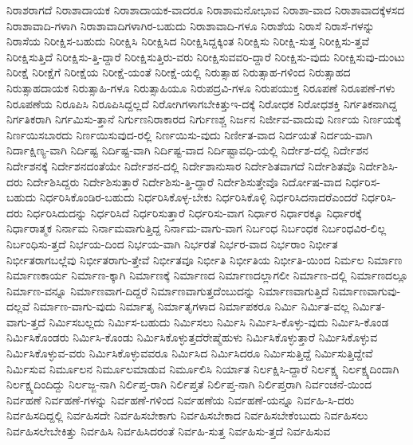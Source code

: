 {ನಿರಾಶರಾಗದೆ
ನಿರಾಶಾದಾಯಕ
ನಿರಾಶಾದಾಯಕ-ವಾದರೂ
ನಿರಾಶಾಮನೋಭಾವ
ನಿರಾಶಾ-ವಾದ
ನಿರಾಶಾವಾದಕ್ಕೆಳಸದ
ನಿರಾಶಾವಾದಿ-ಗಳಾಗಿ
ನಿರಾಶಾವಾದಿಗಳಾಗಿರ-ಬಹುದು
ನಿರಾಶಾವಾದಿ-ಗಳೂ
ನಿರಾಶೆಯ
ನಿರಾಸೆ
ನಿರಾಸೆ-ಗಳನ್ನು
ನಿರಾಸೆಯ
ನಿರೀಕ್ಷಿಸ-ಬಹುದು
ನಿರೀಕ್ಷಿಸಿ
ನಿರೀಕ್ಷಿಸಿದ
ನಿರೀಕ್ಷಿಸಿದ್ದಕ್ಕಿಂತ
ನಿರೀಕ್ಷಿಸು
ನಿರೀಕ್ಷಿ-ಸುತ್ತ
ನಿರೀಕ್ಷಿಸು-ತ್ತವೆ
ನಿರೀಕ್ಷಿಸುತ್ತಿದೆ
ನಿರೀಕ್ಷಿಸು-ತ್ತಿ-ದ್ದಾರೆ
ನಿರೀಕ್ಷಿಸುತ್ತಿರು-ವರು
ನಿರೀಕ್ಷಿಸುವವರಿ-ದ್ದಾರೆ
ನಿರೀಕ್ಷಿಸು-ವುದು
ನಿರೀಕ್ಷಿಸುವು-ದುಂಟು
ನಿರೀಕ್ಷೆ
ನಿರೀಕ್ಷೆಗೆ
ನಿರೀಕ್ಷೆಯ
ನಿರೀಕ್ಷೆ-ಯಂತೆ
ನಿರೀಕ್ಷೆ-ಯಲ್ಲಿ
ನಿರುತ್ಸಾಹ
ನಿರುತ್ಸಾಹ-ಗಳಿಂದ
ನಿರುತ್ಸಾಹದ
ನಿರುತ್ಸಾಹದಾಯಕ
ನಿರುತ್ಸಾಹಿ-ಗಳೂ
ನಿರುತ್ಸಾಹಿಯೂ
ನಿರುಪದ್ರವಿ-ಗಳೂ
ನಿರುಪಯುಕ್ತ
ನಿರೂಪಣೆ
ನಿರೂಪಣೆ-ಗಳು
ನಿರೂಪಣೆಯ
ನಿರೂಪಿಸಿ
ನಿರೂಪಿಸಿದ್ದಲ್ಲದೆ
ನಿರೋಗಿಗಳಾಗಬೇಕಿತ್ತುಇ-ದಕ್ಕೆ
ನಿರೋಧಕ
ನಿರೋಧಶಕ್ತಿ
ನಿರ್ಗತಿಕನಾಗಿದ್ದ
ನಿರ್ಗತಿಕರಾಗಿ
ನಿರ್ಗಮಿಸು-ತ್ತಾನೆ
ನಿರ್ಗುಣನಿರಾಕಾರದ
ನಿರ್ಗುಣಶ್ಚ
ನಿರ್ಜನ
ನಿರ್ಜೀವ-ವಾದುವು
ನಿರ್ಣಯ
ನಿರ್ಣಯಕ್ಕೆ
ನಿರ್ಣಯಿಸಬಾರದು
ನಿರ್ಣಯಿಸುವುದ-ರಲ್ಲಿ
ನಿರ್ಣಯಿಸು-ವುದು
ನಿರ್ಣೀತ-ವಾದ
ನಿರ್ದಯತೆ
ನಿರ್ದಯ-ವಾಗಿ
ನಿರ್ದಾಕ್ಷಿಣ್ಯ-ವಾಗಿ
ನಿರ್ದಿಷ್ಟ
ನಿರ್ದಿಷ್ಟ-ವಾಗಿ
ನಿರ್ದಿಷ್ಟ-ವಾದ
ನಿರ್ದಿಷ್ಟಾವಧಿ-ಯಲ್ಲಿ
ನಿರ್ದೇಶ-ದಲ್ಲಿ
ನಿರ್ದೇಶನ
ನಿರ್ದೇಶನಕ್ಕೆ
ನಿರ್ದೇಶನದಂತೆಯೇ
ನಿರ್ದೇಶನ-ದಲ್ಲಿ
ನಿರ್ದೇಶಾನುಸಾರ
ನಿರ್ದೇಶಿತವಾಗದೆ
ನಿರ್ದೇಶಿತವೊ
ನಿರ್ದೇಶಿಸಿ-ದರು
ನಿರ್ದೇಶಿಸಿದ್ದರು
ನಿರ್ದೇಶಿಸುತ್ತಾರೆ
ನಿರ್ದೇಶಿಸು-ತ್ತಿ-ದ್ದಾರೆ
ನಿರ್ದೇಶಿಸುತ್ತೇವೊ
ನಿರ್ದೋಷ-ವಾದ
ನಿರ್ಧರಿಸ-ಬಹುದು
ನಿರ್ಧರಿಸಿಕೊಂಡಿರ-ಬಹುದು
ನಿರ್ಧರಿಸಿಕೊಳ್ಳ-ಬೇಕು
ನಿರ್ಧರಿಸಿಕೊಳ್ಳಿ
ನಿರ್ಧರಿಸಿದನಾದರೆಎಂದರೆ
ನಿರ್ಧರಿಸಿ-ದರು
ನಿರ್ಧರಿಸಿದುದನ್ನು
ನಿರ್ಧರಿಸಿದೆ
ನಿರ್ಧರಿಸುತ್ತಾರೆ
ನಿರ್ಧರಿಸು-ವಾಗ
ನಿರ್ಧಾರ
ನಿರ್ಧಾರಕ್ಕೂ
ನಿರ್ಧಾರಕ್ಕೆ
ನಿರ್ಧಾರಾತ್ಮಕ
ನಿರ್ನಾಮ
ನಿರ್ನಾಮವಾಗುತ್ತಿದ್ದ
ನಿರ್ನಾಮ-ವಾಗು-ವಾಗ
ನಿರ್ಬಂಧ
ನಿರ್ಬಂಧಕ
ನಿರ್ಬಂಧವಿರ-ಲಿಲ್ಲ
ನಿರ್ಬಂಧಿಸು-ತ್ತದೆ
ನಿರ್ಭಯ-ದಿಂದ
ನಿರ್ಭಯ-ವಾಗಿ
ನಿರ್ಭರತೆ
ನಿರ್ಭರ-ವಾದ
ನಿರ್ಭರಾಂ
ನಿರ್ಭೀತ
ನಿರ್ಭೀತರಾಗಬಲ್ಲೆವು
ನಿರ್ಭೀತರಾಗು-ತ್ತೇವೆ
ನಿರ್ಭೀತವೂ
ನಿರ್ಭೀತಿ
ನಿರ್ಭೀತಿಯ
ನಿರ್ಭೀತಿ-ಯಿಂದ
ನಿರ್ಮಲ
ನಿರ್ಮಾಣ
ನಿರ್ಮಾಣಕಾರ್ಯ
ನಿರ್ಮಾಣ-ಕ್ಕಾಗಿ
ನಿರ್ಮಾಣಕ್ಕೆ
ನಿರ್ಮಾಣದ
ನಿರ್ಮಾಣದಲ್ಲಾಗಲೀ
ನಿರ್ಮಾಣ-ದಲ್ಲಿ
ನಿರ್ಮಾಣದಲ್ಲೂ
ನಿರ್ಮಾಣ-ವನ್ನೂ
ನಿರ್ಮಾಣವಾಗ-ದಿದ್ದರೆ
ನಿರ್ಮಾಣವಾಗುತ್ತದೆಂಬುದನ್ನು
ನಿರ್ಮಾಣವಾಗುತ್ತಿದೆ
ನಿರ್ಮಾಣವಾಗುವು-ದಲ್ಲವೆ
ನಿರ್ಮಾಣ-ವಾಗು-ವುದು
ನಿರ್ಮಾತೃ
ನಿರ್ಮಾತೃಗಳಾದ
ನಿರ್ಮಾಪಕರೂ
ನಿರ್ಮಿ
ನಿರ್ಮಿತ-ವಲ್ಲ
ನಿರ್ಮಿತ-ವಾಗು-ತ್ತದೆ
ನಿರ್ಮಿಸಬಲ್ಲದು
ನಿರ್ಮಿಸ-ಬಹುದು
ನಿರ್ಮಿಸಲು
ನಿರ್ಮಿಸಿ
ನಿರ್ಮಿಸಿ-ಕೊಳ್ಳು-ವುದು
ನಿರ್ಮಿಸಿ-ಕೊಂಡ
ನಿರ್ಮಿಸಿಕೊಂಡರು
ನಿರ್ಮಿಸಿ-ಕೊಂಡು
ನಿರ್ಮಿಸಿಕೊಳ್ಳುತ್ತದೆರೇಷ್ಮೆಹುಳು
ನಿರ್ಮಿಸಿಕೊಳ್ಳುತ್ತಾರೆ
ನಿರ್ಮಿಸಿಕೊಳ್ಳುವ
ನಿರ್ಮಿಸಿಕೊಳ್ಳುವ-ವರು
ನಿರ್ಮಿಸಿಕೊಳ್ಳುವವರೂ
ನಿರ್ಮಿಸಿದ
ನಿರ್ಮಿಸಿದರೂ
ನಿರ್ಮಿಸುತ್ತಿದ್ದೆ
ನಿರ್ಮಿಸುತ್ತಿದ್ದೇವೆ
ನಿರ್ಮಿಸುವ
ನಿರ್ಮೂಲನ
ನಿರ್ಮೂಲಮಾಡುವ
ನಿರ್ಮೂಲಿಸಿ
ನಿರ್ಯಾತ
ನಿರ್ಲಕ್ಷಿಸಿ-ದ್ದಾರೆ
ನಿರ್ಲಕ್ಷ್ಯ
ನಿರ್ಲಕ್ಷ್ಯದಿಂದಾಗಿ
ನಿರ್ಲಕ್ಷ್ಯದಿಂದಿದ್ದು
ನಿರ್ಲಜ್ಜ-ನಾಗಿ
ನಿರ್ಲಿಪ್ತ-ರಾಗಿ
ನಿರ್ಲಿಪ್ತತೆ
ನಿರ್ಲಿಪ್ತ-ನಾಗಿ
ನಿರ್ಲಿಪ್ತರಾಗಿ
ನಿರ್ವಂಚನೆ-ಯಿಂದ
ನಿರ್ವಹಣೆ
ನಿರ್ವಹಣೆ-ಗಳನ್ನು
ನಿರ್ವಹಣೆ-ಗಳಿಂದ
ನಿರ್ವಹಣೆಯ
ನಿರ್ವಹಣೆ-ಯನ್ನೂ
ನಿರ್ವಹಿ-ಸಿ-ದರು
ನಿರ್ವಹಿಸದಿದ್ದಲ್ಲಿ
ನಿರ್ವಹಿಸದೇ
ನಿರ್ವಹಿಸಬೇಕಾಗು
ನಿರ್ವಹಿಸಬೇಕಾದ
ನಿರ್ವಹಿಸಬೇಕೆಂಬುದು
ನಿರ್ವಹಿಸಲು
ನಿರ್ವಹಿಸಲೇಬೇಕಿತ್ತು
ನಿರ್ವಹಿಸಿ
ನಿರ್ವಹಿಸಿದರಂತೆ
ನಿರ್ವಹಿ-ಸುತ್ತ
ನಿರ್ವಹಿಸು-ತ್ತದೆ
ನಿರ್ವಹಿಸುವ
}
